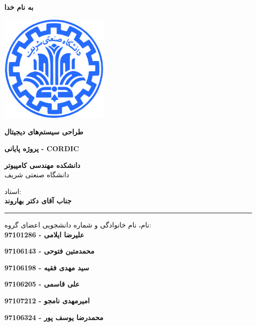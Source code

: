 \documentclass[12pt,titlepage,a4page , tikz , multi,table , svgnames,xcdraw]{article}
\begin{document}
\begin{titlepage}

 \begin{center}
        
       \vspace*{0.5cm}

 \vspace{0.5cm}
       \textbf{ \Huge{به نام خدا} }
       \vspace{0.2cm}
       
       \includegraphics[width=0.4\textwidth]{sharif1.png}
       
 	\vspace{0.3cm}
       \textbf{ \LARGE{طراحی سیستم‌های دیجیتال} }

 
   \vspace{0.3cm}
  \textbf{ \Large{ پروژه پایانی - CORDIC} }
   \vspace{0.3cm}
       
 
      \large \textbf{دانشکده مهندسی کامپیوتر}\\\vspace{0.2cm}
    \large   دانشگاه صنعتی شریف\\\vspace{0.25cm}
      
استاد:\\
    \textbf{{جناب آقای دکتر بهاروند}}

    \vspace{0.15cm}
    \noindent\rule[1ex]{\linewidth}{3pt}
    
    \vspace{0.5cm}
نام، نام خانوادگی و شماره دانشجویی اعضای گروه:\\
    
    \textbf{{علیرضا ایلامی - 97101286}}
        \vspace{0.05cm}
        
     
        \textbf{{محمدمتین فتوحی - 97106143}}
        \vspace{0.05cm}
        
        \textbf{{سید مهدی فقیه - 97106198}}
        \vspace{0.05cm}
        
           \textbf{{علی قاسمی - 97106205}}
        \vspace{0.05cm}
        
        
        \textbf{{امیرمهدی نامجو - 97107212}}
        \vspace{0.05cm}
        
       \textbf{{محمدرضا یوسف پور -  97106324}}
        \vspace{0.05cm}


\end{center}
\end{titlepage}
\end{document}
